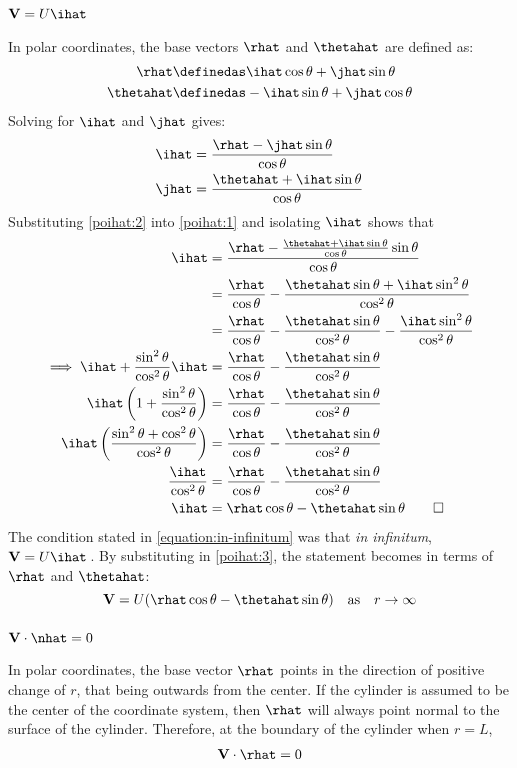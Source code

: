 \subsubsection{$\mathbf{V}=U\ihat$}\label{sec:vuihat}
In polar coordinates, the base vectors $\rhat$ and $\thetahat$ are defined as:
\begin{align*}
	\rhat&\definedas\ihat\cos\theta+\jhat\sin\theta\\
	\thetahat&\definedas-\ihat\sin\theta+\jhat\cos\theta
\end{align*}
Solving for $\ihat$ and $\jhat$ gives:
\begin{align}
	\label{poihat:1}\ihat&=\frac{\rhat-\jhat\sin\theta}{\cos\theta}\\
	\label{poihat:2}\jhat&=\frac{\thetahat+\ihat\sin\theta}{\cos\theta}
\end{align}
Substituting \ref{poihat:2} into \ref{poihat:1} and isolating $\ihat$ shows that
\begin{align}
	\notag\ihat&=\frac{\rhat-\frac{\thetahat+\ihat\sin\theta}{\cos\theta}\sin\theta}{\cos\theta}\\
	\notag&=\frac{\rhat}{\cos\theta}-\frac{\thetahat\sin\theta+\ihat\sin^2\theta}{\cos^2\theta}\\
	\notag&=\frac{\rhat}{\cos\theta}-\frac{\thetahat\sin\theta}{\cos^2\theta}-\frac{\ihat\sin^2\theta}{\cos^2\theta}\\
	\notag\implies\ihat+\frac{\sin^2\theta}{\cos^2\theta}\ihat&=\frac{\rhat}{\cos\theta}-\frac{\thetahat\sin\theta}{\cos^2\theta}\\
	\notag\ihat\left(1+\frac{\sin^2\theta}{\cos^2\theta}\right)&=\frac{\rhat}{\cos\theta}-\frac{\thetahat \sin\theta}{\cos^2\theta}\\
	\notag\ihat\left(\frac{\sin^2\theta+\cos^2\theta}{\cos^2\theta}\right)&=\frac{\rhat}{\cos\theta}-\frac{\thetahat \sin\theta}{\cos^2\theta}\\
	\notag\frac{\ihat}{\cos^2\theta}&=\frac{\rhat}{\cos\theta}-\frac{\thetahat \sin\theta}{\cos^2\theta}\\
	\label{poihat:3}\ihat&=\rhat\cos\theta-\thetahat\sin\theta\qed
\end{align}
The condition stated in \ref{equation:in-infinitum} was that \textit{in infinitum}, $\mathbf{V}=U\ihat$\,. By substituting in \ref{poihat:3}, the statement becomes in terms of $\rhat$ and $\thetahat$:
$$
	\mathbf{V}=U(\rhat\cos\theta-\thetahat\sin\theta)\quad\text{as}\quad r\rightarrow\infty
$$

\subsubsection{$\mathbf{V}\cdot\nhat=0$}\label{sec:vdotnhatzero}
In polar coordinates, the base vector $\rhat$ points in the direction of positive change of $r$, that being outwards from the center. If the cylinder is assumed to be the center of the coordinate system, then $\rhat$ will always point normal to the surface of the cylinder. Therefore, at the boundary of the cylinder when $r=L$,
$$\begin{matrix}
	\mathbf{V}\cdot\rhat=0
\end{matrix}$$

